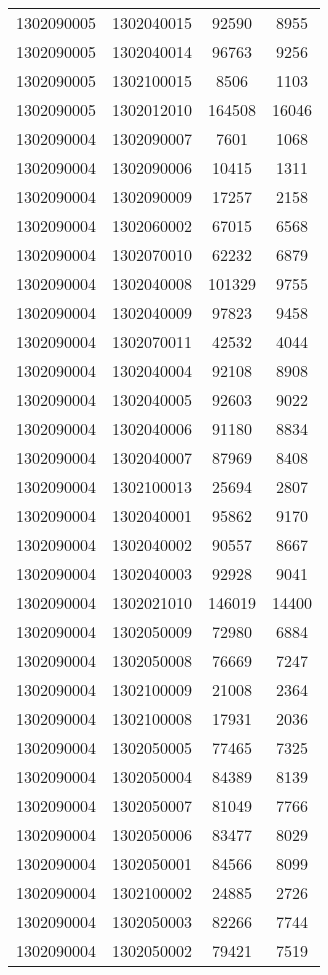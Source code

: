 \begin{longtable}{llcc}
1302090005 & 1302040015 & 92590 & 8955\\
1302090005 & 1302040014 & 96763 & 9256\\
1302090005 & 1302100015 & 8506 & 1103\\
1302090005 & 1302012010 & 164508 & 16046\\
1302090004 & 1302090007 & 7601 & 1068\\
1302090004 & 1302090006 & 10415 & 1311\\
1302090004 & 1302090009 & 17257 & 2158\\
1302090004 & 1302060002 & 67015 & 6568\\
1302090004 & 1302070010 & 62232 & 6879\\
1302090004 & 1302040008 & 101329 & 9755\\
1302090004 & 1302040009 & 97823 & 9458\\
1302090004 & 1302070011 & 42532 & 4044\\
1302090004 & 1302040004 & 92108 & 8908\\
1302090004 & 1302040005 & 92603 & 9022\\
1302090004 & 1302040006 & 91180 & 8834\\
1302090004 & 1302040007 & 87969 & 8408\\
1302090004 & 1302100013 & 25694 & 2807\\
1302090004 & 1302040001 & 95862 & 9170\\
1302090004 & 1302040002 & 90557 & 8667\\
1302090004 & 1302040003 & 92928 & 9041\\
1302090004 & 1302021010 & 146019 & 14400\\
1302090004 & 1302050009 & 72980 & 6884\\
1302090004 & 1302050008 & 76669 & 7247\\
1302090004 & 1302100009 & 21008 & 2364\\
1302090004 & 1302100008 & 17931 & 2036\\
1302090004 & 1302050005 & 77465 & 7325\\
1302090004 & 1302050004 & 84389 & 8139\\
1302090004 & 1302050007 & 81049 & 7766\\
1302090004 & 1302050006 & 83477 & 8029\\
1302090004 & 1302050001 & 84566 & 8099\\
1302090004 & 1302100002 & 24885 & 2726\\
1302090004 & 1302050003 & 82266 & 7744\\
1302090004 & 1302050002 & 79421 & 7519\\

\end{longtable}
